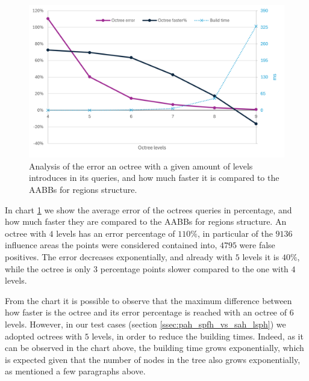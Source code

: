 \documentclass{PoliMi_MasterThesis}
\begin{document}
\begin{figure}[H] 
	\centering
	\includegraphics[width=\textwidth]{Images/octree_error_faster_chart.png}
	\caption{Analysis of the error an octree with a given amount of levels introduces in its queries, and how much faster it is compared to the AABBs for regions structure.}
	\label{fig:octree_error_faster_chart}
\end{figure}

In chart \ref{fig:octree_error_faster_chart} we show the average error of the octrees queries in percentage, and how much faster they are compared to the AABBs for regions structure. An octree with $4$ levels has an error percentage of $110\%$, in particular of the $9136$ influence areas the points were considered contained into, $4795$ were false positives. The error decreases exponentially, and already with $5$ levels it is $40\%$, while the octree is only $3$ percentage points slower compared to the one with $4$ levels.

From the chart it is possible to observe that the maximum difference between how faster is the octree and its error percentage is reached with an octree of $6$ levels. However, in our test cases (section \ref{ssec:pah_spfh_vs_sah_lsph}) we adopted octrees with $5$ levels, in order to reduce the building times. Indeed, as it can be observed in the chart above, the building time grows exponentially, which is expected given that the number of nodes in the tree also grows exponentially, as mentioned a few paragraphs above.
\end{document}
